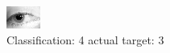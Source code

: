 \begin{figure}[h!]
\begin{center}
\includegraphics[width=0.60\columnwidth]{figures/ID1413_class_4_target_3.png}
\end{center}
\caption{ Classification: 4 actual target: 3}
\label{fig:ID1413_class_4_target_3}
\end{figure}
